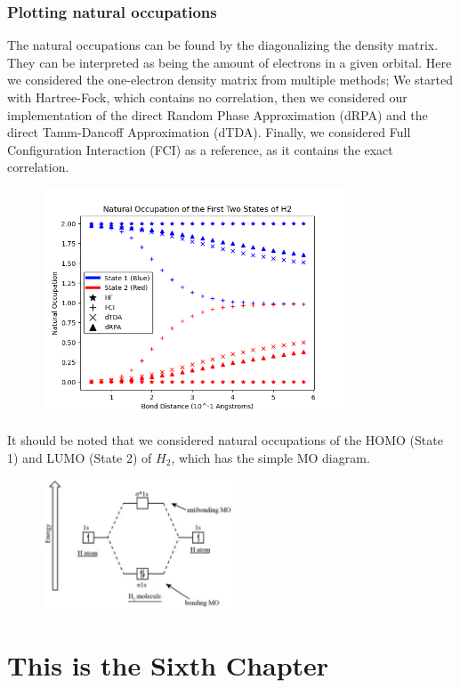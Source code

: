 \documentclass[12pt]{caltech_thesis}
\begin{document}
\subsection{Plotting natural occupations}
The natural occupations can be found by the diagonalizing the density matrix. They can be interpreted as being the amount of electrons in a given orbital.\autocite{szabo_modern_2012} Here we considered the one-electron density matrix from multiple methods; We started with Hartree-Fock, which contains no correlation, then we considered our implementation of the direct Random Phase Approximation (dRPA) and the direct Tamm-Dancoff Approximation (dTDA). Finally, we considered Full Configuration Interaction (FCI) as a reference, as it contains the exact correlation.
\begin{figure}[h]
    \centering
    \includegraphics[width=0.8\textwidth]{h2_occupations.png}
\end{figure}
It should be noted that we considered natural occupations of the HOMO (State 1) and LUMO (State 2) of $H_2$, which has the simple MO diagram.
\begin{figure}[h]
    \centering
    \includegraphics[width=0.5\textwidth]{h2_mo.png}
\end{figure}


\chapter{This is the Sixth Chapter}
\end{document}
